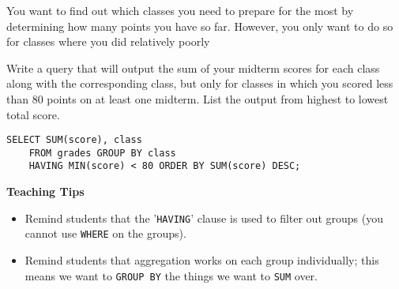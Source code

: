 \begin{blocksection}
\question 
You want to find out which classes you need to prepare for the most by determining how many points you have so far. However, you only want to do so for classes where you did relatively poorly

Write a query that will output the sum of your midterm scores for each class along with the corresponding class, but only for classes in which you scored less than 80 points on at least one midterm. List the output from highest to lowest total score.

\begin{solution}[1.5in]
\begin{lstlisting}
SELECT SUM(score), class
    FROM grades GROUP BY class
    HAVING MIN(score) < 80 ORDER BY SUM(score) DESC;
\end{lstlisting}
\end{solution}
\end{blocksection}

\begin{guide}
\begin{blocksection}
\textbf{Teaching Tips}
\begin{itemize}
    \item Remind students that the '\lstinline{HAVING}' clause is used to filter out groups (you cannot use \lstinline{WHERE} on the groups).
    \item Remind students that aggregation works on each group individually; this means we want to \lstinline{GROUP BY} the things we want to \lstinline{SUM} over.
\end{itemize}
\end{blocksection}
\end{guide}